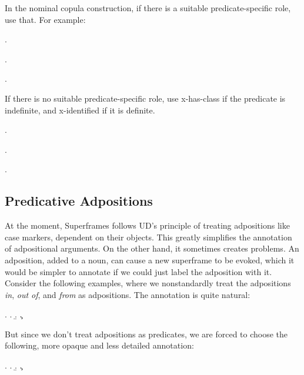 \documentclass[a4paper]{article}
\newcommand{\rl}[1]{\textsf{#1}}
\begin{document}
In the nominal copula construction, if there is a suitable predicate-specific
role, use that. For example:

\ex.

\ex.

\ex.

If there is no suitable predicate-specific role, use \rl{x-has-class} if the
predicate is indefinite, and \rl{x-identified} if it is definite.

\ex.

\ex.

\ex.


\newpage\subsection{Predicative Adpositions}

At the moment, Superframes follows UD's principle of treating adpositions like
case markers, dependent on their objects. This greatly simplifies the
annotation of adpositional arguments. On the other hand, it sometimes creates
problems. An adposition, added to a noun, can cause a new superframe to be
evoked, which it would be simpler to annotate if we could just label the
adposition with it. Consider the following examples, where we nonstandardly
treat the adpositions \emph{in}, \emph{out of}, and \emph{from} as adpositions.
The annotation is quite natural:

\ex.
\a.
\b.
\c.

But since we don't treat adpositions as predicates, we are forced to choose the following, more opaque and less detailed annotation:

\ex.
\a.\label{ex:berge}
\b.\label{ex:office}
\c.\label{ex:miles}
\end{document}

